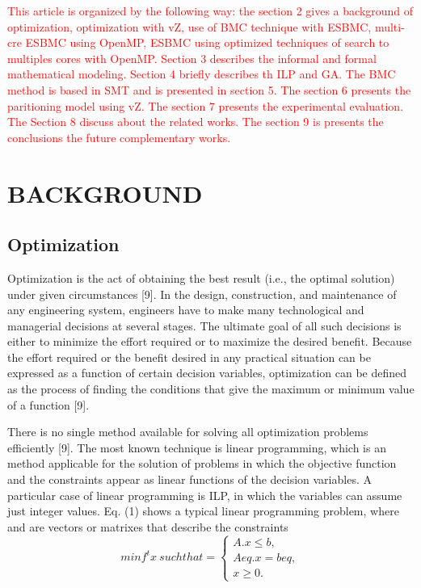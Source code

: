 \textcolor{Red}{This article is organized by the following way: the section 2 gives a background of optimization, optimization with vZ, use of BMC technique with ESBMC, multi-cre ESBMC using OpenMP, ESBMC using optimized techniques of search to multiples cores with OpenMP. Section 3 describes the informal and formal mathematical modeling. Section 4 briefly describes th ILP and GA. The BMC method is based in SMT and is presented in section 5. The section 6 presents the paritioning model using vZ. The section 7 presents the experimental evaluation. The Section 8 discuss about the related works. The section 9 is presents the conclusions the future complementary works.}


\section{BACKGROUND}
\subsection{Optimization}
Optimization is the act of obtaining the best result (i.e., the optimal solution) under given circumstances [9]. In the design, construction, and maintenance of any engineering system, engineers have to make many technological and managerial decisions at several stages. The ultimate goal of all such decisions is either to minimize the effort required or to maximize the desired benefit. Because the effort required or the benefit desired in any practical situation can be expressed as a function of certain decision variables, optimization can be defined as the process of finding the conditions that give the maximum or minimum value of a function [9].

There is no single method available for solving all optimization problems efficiently [9]. The most known technique is linear programming, which is an method applicable for the solution of problems in which the objective function and the constraints appear as linear functions of the decision variables. A particular case of linear programming is ILP, in which the variables can assume just integer values. Eq. (1) shows a typical linear programming problem, where  and  are vectors or matrixes that describe the constraints
\begin{equation}
  minf^t x \: such that  = 
  \begin{cases}
    A.x \leq b, \\ 
    Aeq.x = beq, \\ 
    x \geq 0.
  \end{cases}
\end{equation}

